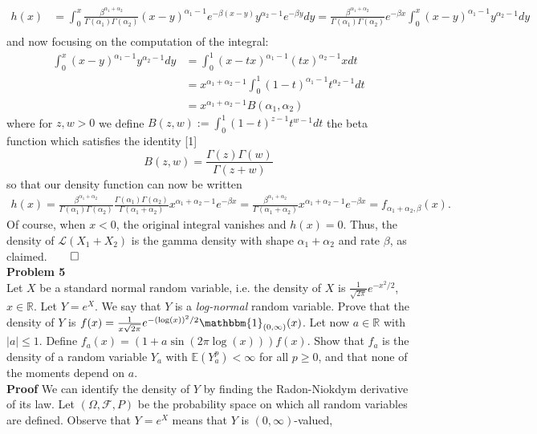 \documentclass[10pt]{article}
\newcommand{\E}{\mathbb{E}}
\newcommand{\mbb}[1]{\mathbb{#1}}
\newcommand{\1}[1]{\mathbbm{1}_{#1}}
\newcommand{\mc}[1]{\mathcal{#1}}
\begin{document}
    \begin{align*}
        h(x)&=\int_0^x\frac{\beta^{\alpha_1+\alpha_2}}{\Gamma(\alpha_1)\Gamma(\alpha_2)}(x-y)^{\alpha_1-1}e^{-\beta(x-y)}y^{\alpha_2-1}e^{-\beta y}dy
        =\frac{\beta^{\alpha_1+\alpha_2}}{\Gamma(\alpha_1)\Gamma(\alpha_2)}e^{-\beta x}\int_0^x(x-y)^{\alpha_1-1}y^{\alpha_2-1}dy\\
    \end{align*}
    and now focusing on the computation of the integral:
    \begin{align*}
        \int_0^x(x-y)^{\alpha_1-1}y^{\alpha_2-1}dy&=\int_0^1(x-tx)^{\alpha_1-1}(tx)^{\alpha_2-1}xdt\tag{substituting $y=tx$}\\
        &=x^{\alpha_1+\alpha_2-1}\int_0^1(1-t)^{\alpha_1-1}t^{\alpha_2-1}dt\\
        &=x^{\alpha_1+\alpha_2-1}B(\alpha_1,\alpha_2)
    \end{align*}
    where for $z,w>0$ we define $B(z,w):=\int_0^1(1-t)^{z-1}t^{w-1}dt$ the beta function which satisfies the identity [1]
    \[B(z,w)=\frac{\Gamma(z)\Gamma(w)}{\Gamma(z+w)}\] 
    so that our density function can now be written
    \begin{align*}
        h(x)=\frac{\beta^{\alpha_1+\alpha_2}}{\Gamma(\alpha_1)\Gamma(\alpha_2)}\frac{\Gamma(\alpha_1)\Gamma(\alpha_2)}{\Gamma(\alpha_1+\alpha_2)}x^{\alpha_1+\alpha_2-1}e^{-\beta x}=\frac{\beta^{\alpha_1+\alpha_2}}{\Gamma(\alpha_1+\alpha_2)}x^{\alpha_1+\alpha_2-1}e^{-\beta x}=f_{\alpha_1+\alpha_2,\beta}(x).
    \end{align*}
    Of course, when $x<0$, the original integral vanishes and $h(x)=0$. Thus, the density of $\mc{L}(X_1+X_2)$ is the gamma density with shape $\alpha_1+\alpha_2$ and rate $\beta$, as claimed.\hfill{$\qed$}\\[5pt]
    {\bf Problem 5}\\[5pt]
    Let $X$ be a standard normal random variable, i.e. the density of $X$ is $\tfrac{1}{\sqrt{2\pi}}e^{-x^2/2}$, $x\in\mbb{R}$. Let $Y=e^X$. We say that $Y$ is a {\it log-normal} random variable.
    Prove that the density of $Y$ is $f(x)=\tfrac{1}{x\sqrt{2\pi}}e^{-(\log(x))^2/2}\1{(0,\infty)}(x)$. Let now $a\in\mbb{R}$ with $|a|\leq1$. Define $f_a(x)=(1+a\sin(2\pi\log(x)))f(x)$. Show that $f_a$ is the density of a random variable $Y_a$
    with $\E{(Y_a^p)}<\infty$ for all $p\geq0$, and that none of the moments depend on $a$.\\[5pt]
    {\bf Proof} We can identify the density of $Y$ by finding the Radon-Niokdym derivative of its law. Let $(\Omega,\mc{F},P)$ be the probability space on which all random variables are defined. Observe that $Y=e^X$ means that $Y$ is $(0,\infty)$-valued,
\end{document}
